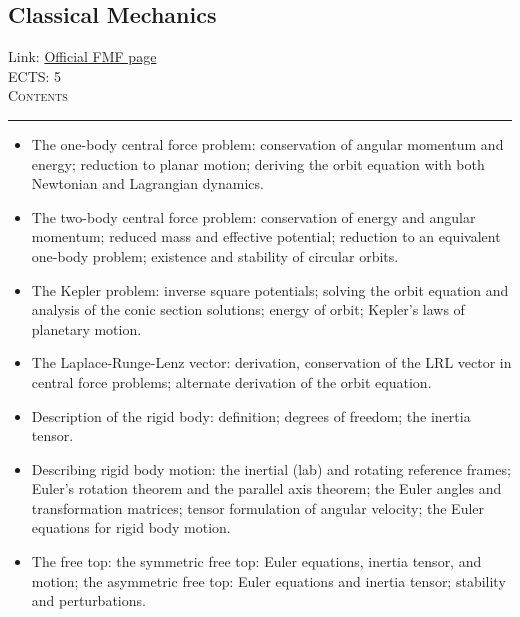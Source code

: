 \documentclass[11pt, a4paper]{article}
\newenvironment{course}[3]{
\subsection{#1}%
Link: \href{#2}{Official FMF page}\\%
ECTS: #3%
\vspace{1ex}
\\
{\large \textsc{Contents}}\\[-0.9ex]%
\rule{\textwidth}{0.5pt}
\vspace{-3ex}
}
{}
\newenvironment{chapter}[1]{
\begin{tcolorbox}[title=#1, breakable]
}
{\end{tcolorbox}}
\begin{document}
\begin{course}{Classical Mechanics}{https://www.fmf.uni-lj.si/en/study-physics/programmes/1fiz/2020/7000777/courses/1155/}{5}
\begin{chapter}{Lagrangian mechanics}
\begin{itemize}
        
        \end{itemize}
    \end{chapter}

    \begin{chapter}{Dynamics of central force motion}
        \begin{itemize}
        
            \item The one-body central force problem: conservation of angular momentum and energy; reduction to planar motion; deriving the orbit equation with both Newtonian and Lagrangian dynamics.

            \item The two-body central force problem: conservation of energy and angular momentum; reduced mass and effective potential; reduction to an equivalent one-body problem; existence and stability of circular orbits.

            \item The Kepler problem: inverse square potentials; solving the orbit equation and analysis of the conic section solutions; energy of orbit; Kepler's laws of planetary motion.

            \item The Laplace-Runge-Lenz vector: derivation, conservation of the LRL vector in central force problems; alternate derivation of the orbit equation.
        
        \end{itemize}
    \end{chapter}

    \begin{chapter}{Rigid body dynamics}
        \begin{itemize}
        
            \item Description of the rigid body: definition; degrees of freedom; the inertia tensor.

            \item Describing rigid body motion: the inertial (lab) and rotating reference frames; Euler's rotation theorem and the parallel axis theorem; the Euler angles and transformation matrices; tensor formulation of angular velocity; the Euler equations for rigid body motion.

            \item The free top: the symmetric free top: Euler equations, inertia tensor, and motion; the asymmetric free top: Euler equations and inertia tensor; stability and perturbations.


\end{itemize}
\end{chapter}
\end{course}
\end{document}
